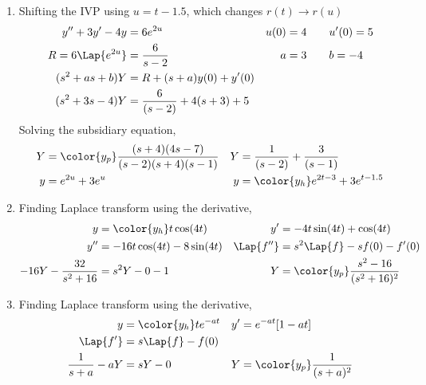 \begin{enumerate}
    \item Shifting the IVP using $ u = t-1.5 $, which changes $ r(t) \rightarrow r(u) $
          \begin{align}
              y'' + 3y' - 4y      & = 6e^{2u}                      &
              u(0)                & = 4 \qquad u'(0) = 5             \\
              R = 6\Lap\{e^{2u}\} & = \frac{6}{s-2}                &
              a                   & = 3 \qquad b = -4                \\
              (s^2 + as + b)Y     & = R + (s+a)y(0) + y'(0)          \\
              (s^2 + 3s - 4)Y     & = \frac{6}{(s-2)} + 4(s+3) + 5
          \end{align}
          Solving the subsidiary equation,
          \begin{align}
              Y                 & = \color{y_p}\frac{(s+4)(4s - 7)}
              {(s-2)(s+4)(s-1)} &
              Y                 & = \frac{1}{(s-2)} + \frac{3}{(s-1)}     \\
              y                 & = e^{2u} + 3e^{u}                     &
              y                 & = \color{y_h} e^{2t-3}  + 3e^{t- 1.5}
          \end{align}

    \item Finding Laplace transform using the derivative,
          \begin{align}
              y                          & = \color{y_h} t\cos(4t)                &
              y'                         & = -4t\sin(4t) + \cos(4t)                 \\
              y''                        & = -16t\cos(4t) - 8\sin(4t)             &
              \Lap\{f''\}                & = s^2\Lap\{f\} - sf(0) - f'(0)           \\
              -16Y - \frac{32}{s^2 + 16} & = s^2Y - 0 - 1                         &
              Y                          & = \color{y_p}\frac{s^2-16}{(s^2+16)^2}
          \end{align}

    \item Finding Laplace transform using the derivative,
          \begin{align}
              y                  & = \color{y_h} te^{-at}         &
              y'                 & = e^{-at}[1 - at]                \\
              \Lap\{f'\}         & = s\Lap\{f\} - f(0)              \\
              \frac{1}{s+a} - aY & = sY - 0                       &
              Y                  & = \color{y_p}\frac{1}{(s+a)^2}
          \end{align}


\end{enumerate}
